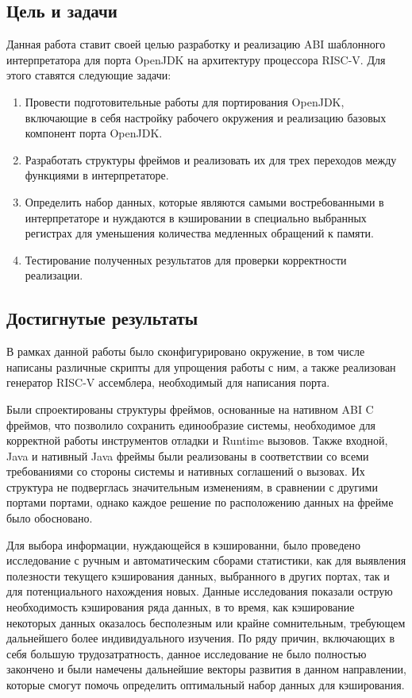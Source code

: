 \subsection*{Цель и задачи}

Данная работа ставит своей целью разработку и реализацию ABI шаблонного интерпретатора для порта OpenJDK на архитектуру процессора RISC-V. Для этого ставятся следующие задачи:

\begin{enumerate}
    \item Провести подготовительные работы для портирования OpenJDK, включающие в себя настройку рабочего окружения и реализацию базовых компонент порта OpenJDK.
    \item Разработать структуры фреймов и реализовать их для трех переходов между функциями в интерпретаторе.
    \item Определить набор данных, которые являются самыми востребованными в интерпретаторе и нуждаются в кэшировании в специально выбранных регистрах для уменьшения количества медленных обращений к памяти.
    \item Тестирование полученных результатов для проверки корректности реализации.
\end{enumerate}




\subsection*{Достигнутые результаты}

В рамках данной работы было сконфигурировано окружение, в том числе написаны различные скрипты для упрощения работы с ним, а также реализован генератор RISC-V ассемблера, необходимый для написания порта.

Были спроектированы структуры фреймов, основанные на нативном ABI C фреймов, что позволило сохранить единообразие системы, необходимое для корректной работы инструментов отладки и Runtime вызовов. Также входной, Java и нативный Java фреймы были реализованы в соответствии со всеми требованиями со стороны системы и нативных соглашений о вызовах. Их структура не подверглась значительным изменениям, в сравнении с другими портами портами, однако каждое решение по расположению данных на фрейме было обосновано.

Для выбора информации, нуждающейся в кэшированни, было проведено исследование с ручным и автоматическим сборами статистики, как для выявления полезности текущего кэширования данных, выбранного в других портах, так и для потенциального нахождения новых. Данные исследования показали острую необходимость кэширования ряда данных, в то время, как кэширование некоторых данных оказалось бесполезным или крайне сомнительным, требующем дальнейшего более индивидуального изучения. По ряду причин, включающих в себя большую трудозатратность, данное исследование не было полностью закончено и были намечены дальнейшие векторы развития в данном направлении, которые смогут помочь определить оптимальный набор данных для кэширования.


